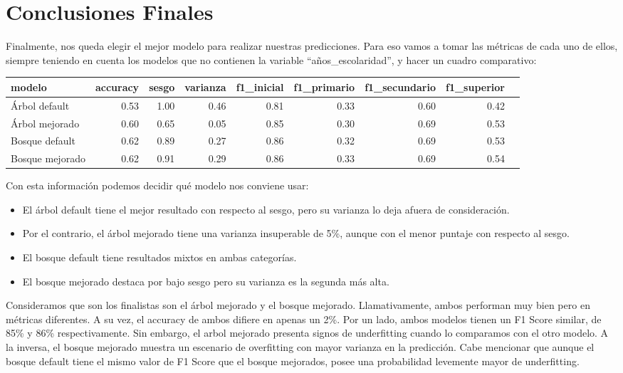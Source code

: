 \documentclass[a4paper]{article}
\begin{document}
\newpage

\section{Conclusiones Finales}

    Finalmente, nos queda elegir el mejor modelo para realizar nuestras predicciones. Para eso vamos a tomar las métricas de cada uno de ellos, siempre teniendo en cuenta los modelos que no contienen la variable ``años\_escolaridad'', y hacer un cuadro comparativo:
    
    \begin{table}[H]
        \centering
        \begin{tabular}{|l|r|r|r|r|r|r|r|r|}
            \hline
            modelo & accuracy & sesgo & varianza & f1\_inicial & f1\_primario & f1\_secundario & f1\_superior \\ \hline
            Árbol default & 0.53 & 1.00 & 0.46 & 0.81 & 0.33 & 0.60 & 0.42 \\ \hline
            Árbol mejorado & 0.60 & 0.65 & 0.05 & 0.85 & 0.30 & 0.69 & 0.53 \\ \hline
            Bosque default & 0.62 & 0.89 & 0.27 & 0.86 & 0.32 & 0.69 & 0.53 \\ \hline
            Bosque mejorado & 0.62 & 0.91 & 0.29 & 0.86 & 0.33 & 0.69 & 0.54 \\ \hline
        \end{tabular}
    \end{table}

    Con esta información podemos decidir qué modelo nos conviene usar:
    \begin{itemize}
        \item El árbol default tiene el mejor resultado con respecto al sesgo, pero su varianza lo deja afuera de consideración.
        \item Por el contrario, el árbol mejorado tiene una varianza insuperable de 5\%, aunque con el menor puntaje con respecto al sesgo.
        \item El bosque default tiene resultados mixtos en ambas categorías.
        \item El bosque mejorado destaca por bajo sesgo pero su varianza es la segunda más alta.
    \end{itemize}
    
    Consideramos que son los finalistas son el árbol mejorado y el bosque mejorado. Llamativamente, ambos performan muy bien pero en métricas diferentes. A su vez, el accuracy de ambos difiere en apenas un 2\%. Por un lado, ambos modelos tienen un F1 Score similar, de 85\% y 86\% respectivamente. Sin embargo, el arbol mejorado presenta signos de underfitting cuando lo comparamos con el otro modelo. A la inversa, el bosque mejorado muestra un escenario de overfitting con mayor varianza en la predicción. Cabe mencionar que aunque el bosque default tiene el mismo valor de F1 Score que el bosque mejorados, posee una probabilidad levemente mayor de underfitting. 
    
\end{document}
